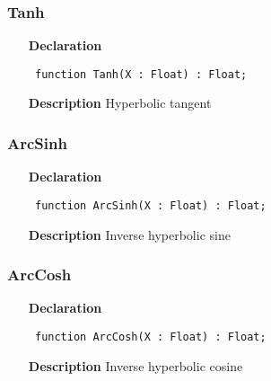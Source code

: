 \documentclass[12pt,a4paper,oneside]{report}
\newcommand{\declarationitem}[1]{\textbf{#1}}
\newcommand{\descriptiontitle}[1]{\textbf{#1}}
\newcommand{\code}[1]{\texttt{#1}}
\begin{document}
\subsubsection{Tanh}
\label{uhyper-Tanh}
\begin{itemize}\item[\declarationitem{Declaration}\hfill]
	\begin{flushleft}
		\code{
			function Tanh(X : Float) : Float;}
		
	\end{flushleft}
	
	\par
	\item[\descriptiontitle{Description}]
	Hyperbolic tangent
	
\end{itemize}
\subsubsection{ArcSinh}
\label{uhyper-ArcSinh}
\begin{itemize}\item[\declarationitem{Declaration}\hfill]
	\begin{flushleft}
		\code{
			function ArcSinh(X : Float) : Float;}
		
	\end{flushleft}
	
	\par
	\item[\descriptiontitle{Description}]
	Inverse hyperbolic sine
	
\end{itemize}
\subsubsection{ArcCosh}
\label{uhyper-ArcCosh}
\begin{itemize}\item[\declarationitem{Declaration}\hfill]
	\begin{flushleft}
		\code{
			function ArcCosh(X : Float) : Float;}
		
	\end{flushleft}
	
	\par
	\item[\descriptiontitle{Description}]
	Inverse hyperbolic cosine
	
\end{itemize}
\end{document}
